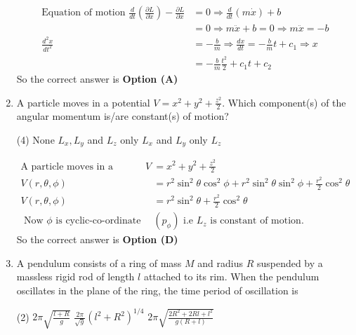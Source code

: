 \begin{enumerate}
\begin{tasks}
	\end{tasks}	
\begin{answer}
	\begin{align*}
	\text{Equation of motion }\frac{d}{d t}\left(\frac{\partial L}{\partial \dot{x}}\right)-\frac{\partial L}{\partial x}&=0 \Rightarrow \frac{d}{d t}(m \dot{x})+b\\&=0 \Rightarrow m \ddot{x}+b=0 \Rightarrow m \ddot{x}=-b\\
	\frac{d^{2} x}{d t^{2}}&=-\frac{b}{m} \Rightarrow \frac{d x}{d t}=-\frac{b}{m} t+c_{1} \Rightarrow x\\&=-\frac{b}{m} \frac{t^{2}}{2}+c_{1} t+c_{2}
	\end{align*}
	So the correct answer is \textbf{Option (A)}
\end{answer}
	\item A particle moves in a potential $V=x^{2}+y^{2}+\frac{z^{2}}{2} .$ Which component(s) of the angular momentum is/are constant(s) of motion?
	{}
	\begin{tasks}(4)
		\task[\textbf{A.}] None
		\task[\textbf{B.}] $L_{x}, L_{y}$ and $L_{z}$
		\task[\textbf{C.}]  only $L_{x}$ and $L_{y}$
		\task[\textbf{D.}] only $L_{z}$
	\end{tasks}
\begin{answer}
	\begin{align*}
	\text{A particle moves in a potential }V&=x^{2}+y^{2}+\frac{z^{2}}{2}\\
	V(r, \theta, \phi)&=r^{2} \sin ^{2} \theta \cos ^{2} \phi+r^{2} \sin ^{2} \theta \sin ^{2} \phi+\frac{r^{2}}{2} \cos ^{2} \theta\\
	V(r, \theta, \phi)&=r^{2} \sin ^{2} \theta+\frac{r^{2}}{2} \cos ^{2} \theta\\
	\text{	Now $\phi$ is cyclic-co-ordinate }&\left(p_{\phi}\right)\text{ i.e $L_{z}$ is constant of motion.}
	\end{align*}
	So the correct answer is \textbf{Option (D)}
\end{answer}
	\item A pendulum consists of a ring of mass $M$ and radius $R$ suspended by a massless rigid rod of length $l$ attached to its rim. When the pendulum oscillates in the plane of the ring, the time period of oscillation is
	{}
	\begin{tasks}(2)
		\task[\textbf{A.}] $2 \pi \sqrt{\frac{l+R}{g}}$
		\task[\textbf{B.}] $\frac{2 \pi}{\sqrt{g}}\left(l^{2}+R^{2}\right)^{1 / 4}$
		\task[\textbf{C.}] $2 \pi \sqrt{\frac{2 R^{2}+2 R l+l^{2}}{g(R+l)}}$

\end{tasks}
\end{enumerate}
